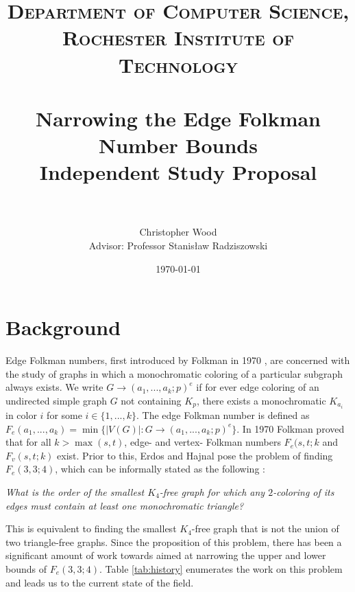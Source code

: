 \documentclass[paper=a4, fontsize=11pt]{scrartcl} %
\title{	
\normalfont \normalsize 
\textsc{Department of Computer Science, Rochester Institute of Technology} \\ [25pt] %
\horrule{2pt} \\[0.4cm] %
\huge Narrowing the Edge Folkman Number Bounds \\ 
\Large Independent Study Proposal \\
\horrule{2pt} \\[0.5cm] %
}
\author{Christopher Wood \\ Advisor: Professor Stanis{\l}aw Radziszowski} %
\date{\normalsize\today} %
\begin{document}
\maketitle %


\section{Background}
Edge Folkman numbers, first introduced by Folkman in 1970 \cite{Folkman}, are concerned
with the study of graphs in which a monochromatic coloring of a particular subgraph always exists. 
We write $G \to (a_1, ..., a_k; p)^e$ if for ever edge coloring of an undirected simple graph $G$ not 
containing $K_p$, there exists a monochromatic $K_{a_{i}}$ in color $i$ for some $i \in \{1, ..., k\}$. 
The edge Folkman number is defined as $F_e(a_1, ..., a_k) = \min\{|V(G)| : G \to (a_1, ..., a_k; p)^e\}$.
In 1970 Folkman proved that for all $k > \max(s,t)$, edge- and vertex- Folkman numbers $F_e(s,t;k$
and $F_v(s,t;k)$ exist. Prior to this, Erdos and Hajnal pose the problem of finding $F_e(3,3;4)$, which
can be informally stated as the following \cite{Erdos01}: 

\noindent \emph{What is the order of the smallest $K_4$-free graph for which any $2$-coloring of 
its edges must contain at least one monochromatic triangle?}

This is equivalent to finding the smallest $K_4$-free graph that is not the union of two 
triangle-free graphs. Since the proposition of this problem, there has been a significant
amount of work towards aimed at narrowing the upper and lower bounds of $F_e(3,3;4)$. 
Table \ref{tab:history} enumerates the work on this problem and leads us to the 
current state of the field.
\end{document}
